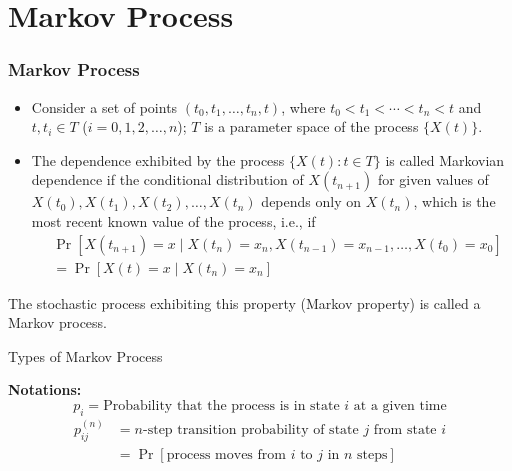 \documentclass[aspectratio=169]{beamer}
\begin{document}
 
    \section{Markov Process}
 
 
    \begin{frame}
    \frametitle{Markov Process}
        \begin{itemize}
            \item Consider a set of points $(t_0, t_1, \ldots, t_n, t)$, where $t_0 < t_1 < \cdots < t_n < t$ and $t, t_i \in T$ ($i = 0, 1, 2, \ldots, n$); $T$ is a parameter space of the process $\{X(t)\}$.
            \item The dependence exhibited by the process $\{X(t): t \in T\}$ is called Markovian dependence if the conditional distribution of $X(t_{n+1})$ for given values of $X(t_0), X(t_1), X(t_2), \ldots, X(t_n)$ depends only on $X(t_n)$, which is the most recent known value of the process, i.e., if
            \begin{align*}
                &\Pr[X(t_{n+1}) = x \mid X(t_n) = x_n, X(t_{n-1}) = x_{n-1}, \ldots, X(t_0) = x_0] \\
                &= \Pr[X(t) = x \mid X(t_n) = x_n]
            \end{align*}
        \end{itemize}
        The stochastic process exhibiting this property (Markov property) is called a Markov process.
    \end{frame}
 
 
    \begin{frame}{Types of Markov Process}
        \begin{table}
            \centering
        \end{table}
 
        \textbf{Notations:}
        \[
        p_i = \text{Probability that the process is in state } i \text{ at a given time}
        \]
        \begin{align*}
            p_{ij}^{(n)} &= n\text{-step transition probability of state } j \text{ from state } i \\
            &= \Pr[\text{process moves from } i \text{ to } j \text{ in } n \text{ steps}]
        \end{align*}
    \end{frame}
 
\end{document}
